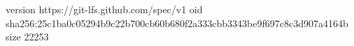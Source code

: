 version https://git-lfs.github.com/spec/v1
oid sha256:25c1ba0c05294b9c22b700cb60b680f2a333cbb3343be9f697c8c3d907a4164b
size 22253
